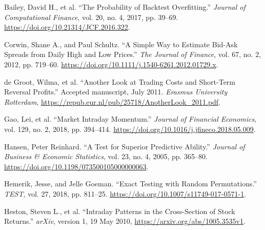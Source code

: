 \documentclass[11pt,a4paper]{article}
\begin{document}
{\RaggedRight\hangindent=1.27cm\noindent Bailey, David H., et al. “The Probability of Backtest Overfitting.” \textit{Journal of Computational Finance}, vol. 20, no. 4, 2017, pp. 39–69. \url{https://doi.org/10.21314/JCF.2016.322}.\par}\vspace{5pt}

{\RaggedRight\hangindent=1.27cm\noindent Corwin, Shane A., and Paul Schultz. “A Simple Way to Estimate Bid-Ask Spreads from Daily High and Low Prices.” \textit{The Journal of Finance}, vol. 67, no. 2, 2012, pp. 719–60. \url{https://doi.org/10.1111/j.1540-6261.2012.01729.x}.\par}\vspace{5pt}

{\RaggedRight\hangindent=1.27cm\noindent de Groot, Wilma, et al. “Another Look at Trading Costs and Short-Term Reversal Profits.” Accepted manuscript, July 2011. \textit{Erasmus University Rotterdam}, \url{https://repub.eur.nl/pub/25718/AnotherLook_2011.pdf}.\par}\vspace{5pt}

{\RaggedRight\hangindent=1.27cm\noindent Gao, Lei, et al. “Market Intraday Momentum.” \textit{Journal of Financial Economics}, vol. 129, no. 2, 2018, pp. 394–414. \url{https://doi.org/10.1016/j.jfineco.2018.05.009}.\par}\vspace{5pt}

{\RaggedRight\hangindent=1.27cm\noindent Hansen, Peter Reinhard. “A Test for Superior Predictive Ability.” \textit{Journal of Business \& Economic Statistics}, vol. 23, no. 4, 2005, pp. 365–80. \url{https://doi.org/10.1198/073500105000000063}.\par}\vspace{5pt}

{\RaggedRight\hangindent=1.27cm\noindent Hemerik, Jesse, and Jelle Goeman. “Exact Testing with Random Permutations.” \textit{TEST}, vol. 27, 2018, pp. 811–25. \url{https://doi.org/10.1007/s11749-017-0571-1}.\par}\vspace{5pt}

{\RaggedRight\hangindent=1.27cm\noindent Heston, Steven L., et al. “Intraday Patterns in the Cross-Section of Stock Returns.” \textit{arXiv}, version 1, 19 May 2010, \url{https://arxiv.org/abs/1005.3535v1}.\par}\vspace{5pt}
\end{document}

